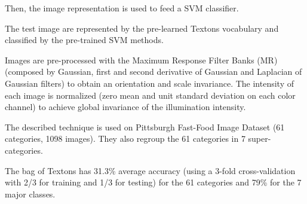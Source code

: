 Then, the image representation is used to feed a SVM classifier.


The test image are represented by the pre-learned Textons vocabulary and classified by the pre-trained SVM methods.

Images are pre-processed with the Maximum Response Filter Banks (MR) (composed by Gaussian, first and second derivative of Gaussian and Laplacian of Gaussian filters) to obtain an orientation and scale invariance. The intensity of each image is normalized (zero mean and unit standard deviation on each color channel) to achieve global invariance of the illumination intensity.

The described technique is used on Pittsburgh Fast-Food Image Dataset (61 categories, 1098 images). They also regroup the 61 categories in 7 super-categories.

The bag of Textons has 31.3\% average accuracy (using a 3-fold cross-validation with 2/3 for training and 1/3 for testing) for the 61 categories and 79\% for the 7 major classes.